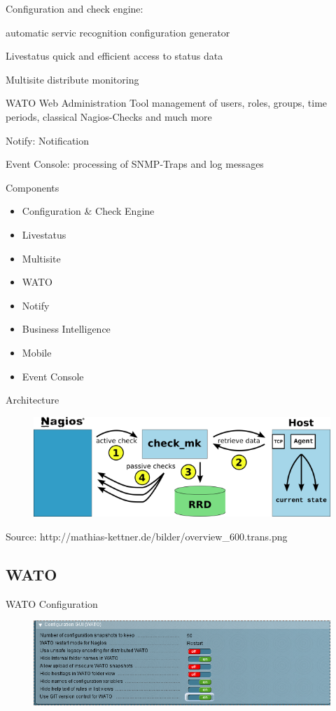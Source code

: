 Configuration and check engine:

automatic servic recognition
configuration generator

Livestatus
quick and efficient access to status data

Multisite
distribute monitoring

WATO
Web Administration Tool
management of users, roles, groups, time periods, 
classical Nagios-Checks and much more

Notify:
Notification

Event Console:
processing of SNMP-Traps and log messages

\begin{frame}[fragile]{Components}
\begin{itemize}
\item Configuration \& Check Engine
\item Livestatus
\item Multisite
\item WATO
\item Notify
\item Business Intelligence
\item Mobile
\item Event Console
\end{itemize}
\end{frame}

\begin{frame}{Architecture}
\begin{figure}
\includegraphics[width=\textwidth]{images/overview_600_trans.png}
\end{figure}
Source: http://mathias-kettner.de/bilder/overview\_600.trans.png
\end{frame}

\subsection{WATO}

\begin{frame}{WATO Configuration}
\begin{figure}
\includegraphics[width=\textwidth]{images/wato-config.png}
\end{figure}
\end{frame}

